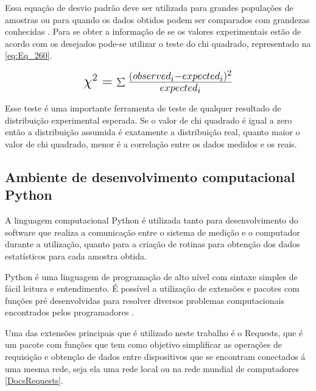 %
%
%
%

\hfill

Essa equação de desvio padrão deve ser utilizada para grandes populações de amostras ou para quando os dados obtidos podem ser comparados com grandezas conhecidas \autocite{Hollman2011}.
Para se obter a informação de se os valores experimentais estão de acordo com os desejados pode-se utilizar o teste do chi quadrado, representado na \autoref{eq:Eq_260}.

\begin{equation}\label{eq:Eq_260}%
\mbox{\fontsize{17.28}{21.6}\selectfont\( %
\chi^{2} = \sum{\frac{(observed_i - expected_i)^{2}}{expected_i}}
\)} %
\end{equation}

%
%
%

\hfill

Esse teste é uma importante ferramenta de teste de qualquer resultado de distribuição experimental esperada. Se o valor de chi quadrado é igual a zero
então a distribuição assumida é exatamente a distribuição real, quanto maior o valor de chi quadrado, menor é a correlação entre os dados medidos e os reais. \autocite{Hollman2011}

\subsection{Ambiente de desenvolvimento computacional Python}

A linguagem computacional Python é utilizada tanto para desenvolvimento do software que realiza a comunicação entre o sistema de medição e o computador durante a utilização,
quanto para a criação de rotinas para obtenção dos dados estatísticos para cada amostra obtida.

Python é uma linguagem de programação de alto nível com sintaxe simples de fácil leitura e entendimento.
É possível a utilização de extensões e pacotes com funções pré desenvolvidas para resolver diversos problemas computacionais encontrados pelos programadores \autocite{TimHall2010}.

Uma das extensões principais que é utilizado neste trabalho é o Requests, que é um pacote com funções que tem como objetivo simplificar as operações de requisição e obtenção de dados entre dispositivos
que se encontram conectados á uma mesma rede, seja ela uma rede local ou na rede mundial de computadores \autoref{DocsRequests}.

